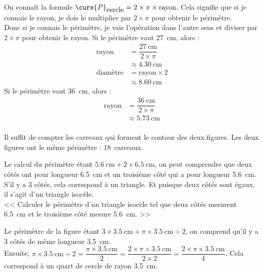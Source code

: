 \documentclass[../Cours.tex]{subfiles}
\begin{document}
\begin{questions}
    \exercice On connaît la formule $\curs{P}_{\mbox{cercle}} = 2 \times \pi \times \mbox{rayon}$. Cela signifie que si je connais le rayon, je dois le multiplier par $2 \times \pi$ pour obtenir le périmètre. \\
    Donc si je connais le périmètre, je vais l'opération dans l'autre sens et diviser par $2 \times \pi$ pour obtenir le rayon.
    \question Si le périmètre vaut \qty{27}{\centi\metre}, alors :
    \begin{align*}
        \mbox{rayon} &= \dfrac{\qty{27}{\centi\metre}}{2 \times \pi} \\ 
        & \boxed{\approx \qty{4.30}{\centi\metre}} \\
        \mbox{diamètre} &= \mbox{rayon} \times 2 \\ 
        & \boxed{\approx \qty{8.60}{\centi\metre}}
    \end{align*}
    \question Si le périmètre vaut \qty{36}{\centi\metre}, alors :
    \begin{align*}
        \mbox{rayon} &= \dfrac{\qty{36}{\centi\metre}}{2 \times \pi} \\ 
        & \boxed{\approx \qty{5.73}{\centi\metre}} \\
    \end{align*}

    \exercice Il suffit de compter les carreaux qui forment le contour des deux figures. Les deux figures ont le même périmètre : \qty{18}{carreaux}.

    \exercice Le calcul du périmètre étant $\qty{5.6}{\centi\metre} + 2 \times \qty{6.5}{\centi\metre}$, on peut comprendre que deux côtés ont pour longueur \qty{6.5}{\centi\metre} et un troisième côté qui a pour longueur \qty{5.6}{\centi\metre}.\\
    S'il y a 3 côtés, cela correspond à un triangle. Et puisque deux côtés sont égaux, il s'agit d'un triangle isocèle.\\

    << Calculer le périmètre d'un triangle isocèle tel que deux côtés mesurent \qty{6.5}{\centi\metre} et le troisième côté mesure \qty{5.6}{\centi\metre}. >>

    \clearpage
    \exercice Le périmètre de la figure étant $3 \times \qty{3.5}{\centi\metre} + \pi \times \qty{3.5}{\centi\metre} \div 2$, on comprend qu'il y a 3 côtés de même longueur \qty{3.5}{\centi\metre}.\\
    Ensuite, $\pi \times \qty{3.5}{\centi\metre} \div 2 = \dfrac{\pi \times \qty{3.5}{\centi\metre}}{2} = \dfrac{2 \times \pi \times \qty{3.5}{\centi\metre}}{2 \times 2} = \dfrac{2 \times \pi \times \qty{3.5}{\centi\metre}}{4} $. Cela correspond à un quart de cercle de rayon \qty{3.5}{\centi\metre}.


\end{questions}
\end{document}
